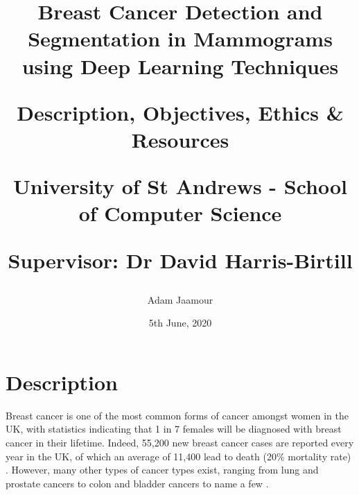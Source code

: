 \documentclass[letterpaper,12pt]{article}
\begin{document}
\title{
    Breast Cancer Detection and Segmentation in Mammograms using Deep Learning Techniques\\
    \vspace*{1cm}
    \begin{Large}
    Description, Objectives, Ethics \& Resources\\
    \end{Large}
    \vspace*{1cm}
    \begin{large}
    University of St Andrews - School of Computer Science\\
    \end{large}
    \begin{large}
    Supervisor: Dr David Harris-Birtill
    \end{large}
    \vspace*{0.5cm}
}
\author{Adam Jaamour} %
\date{5th June, 2020}
\maketitle
\newpage


\section{Description}
\label{sec:description}

Breast cancer is one of the most common forms of cancer amongst women in the UK, with statistics indicating that 1 in 7 females will be diagnosed with breast cancer in their lifetime. Indeed, 55,200 new breast cancer cases are reported every year in the UK, of which an average of 11,400 lead to death (20\% mortality rate) \cite{BreastCancerResearchUK}. However, many other types of cancer types exist, ranging from lung and prostate cancers to colon and bladder cancers to name a few \cite{cokkinides2005american}.\\
\end{document}
